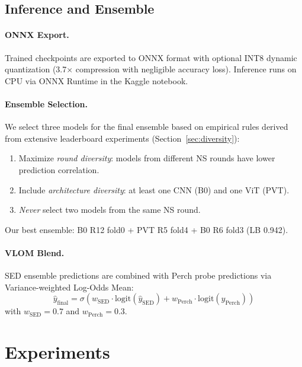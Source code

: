 \documentclass[a4paper]{article}
\begin{document}
\subsection{Inference and Ensemble}
\label{sec:inference}

\paragraph{ONNX Export.}
Trained checkpoints are exported to ONNX format with optional INT8 dynamic quantization (3.7$\times$ compression with negligible accuracy loss).
Inference runs on CPU via ONNX Runtime in the Kaggle notebook.

\paragraph{Ensemble Selection.}
We select three models for the final ensemble based on empirical rules derived from extensive leaderboard experiments (Section~\ref{sec:diversity}):
\begin{enumerate}[nosep]
    \item Maximize \emph{round diversity}: models from different NS rounds have lower prediction correlation.
    \item Include \emph{architecture diversity}: at least one CNN (B0) and one ViT (PVT).
    \item \emph{Never} select two models from the same NS round.
\end{enumerate}

Our best ensemble: B0 R12 fold0 + PVT R5 fold4 + B0 R6 fold3 (LB 0.942).

\paragraph{VLOM Blend.}
SED ensemble predictions are combined with Perch probe predictions via Variance-weighted Log-Odds Mean:
\begin{equation}
\hat{y}_\text{final} = \sigma\left(w_\text{SED} \cdot \text{logit}(\hat{y}_\text{SED}) + w_\text{Perch} \cdot \text{logit}(\hat{y}_\text{Perch})\right)
\end{equation}
with $w_\text{SED}=0.7$ and $w_\text{Perch}=0.3$.

\section{Experiments}
\label{sec:experiments}
\end{document}

